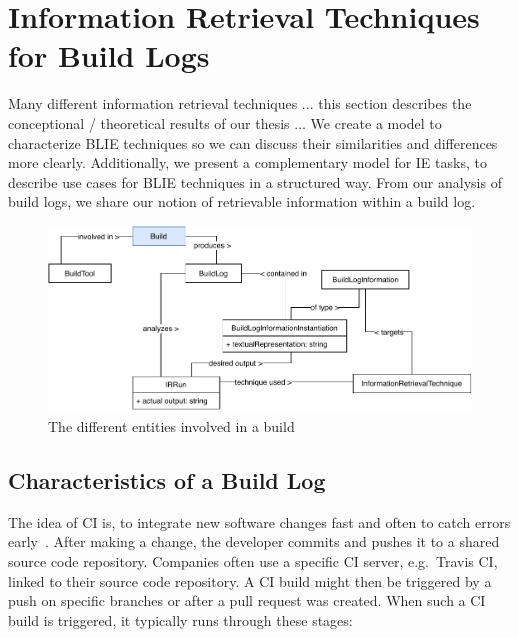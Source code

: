 \documentclass[\myrootdir/main.tex]{subfiles}
\begin{document}
\chapter{Information Retrieval Techniques for Build Logs}
\label{sec:ir-techniques}
Many different information retrieval techniques ... this section describes the conceptional / theoretical results of our thesis ...
We create a model to characterize BLIE techniques so we can discuss their similarities and differences more clearly.
Additionally, we present a complementary model for IE tasks, to describe use cases for BLIE techniques in a structured way.
From our analysis of build logs, we share our notion of retrievable information within a build log.

\begin{figure}[htbp]
	\centering
	\includegraphics[width=\textwidth, clip]{img/build-overview.pdf}
	\caption{The different entities involved in a build}
	\label{fig:build-overview}
\end{figure}

\section{Characteristics of a Build Log}
\label{sec:bl-characteristics}
The idea of CI is, to integrate new software changes fast and often to catch errors early~\cite{humble2010continuous}.
After making a change, the developer commits and pushes it to a shared source code repository.
Companies often use a specific CI server, e.g.\ Travis CI, linked to their source code repository.
A CI build might then be triggered by a push on specific branches or after a pull request was created.
When such a CI build is triggered, it typically runs through these stages:
\end{document}
